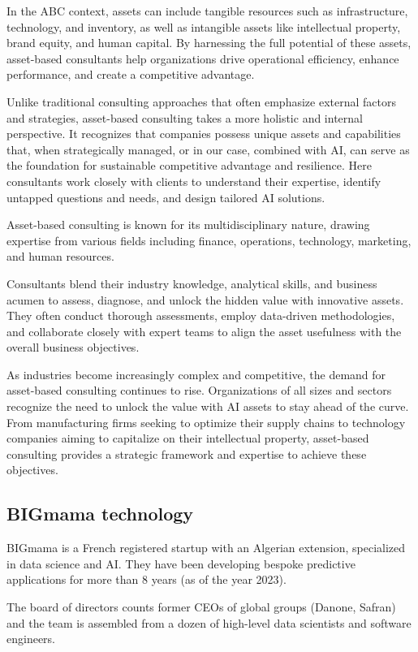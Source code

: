 \documentclass[a4paper,12pt]{article}
\begin{document}
In the ABC context, assets can include tangible resources such as infrastructure, 
technology, and inventory, as well as intangible assets like intellectual property, brand equity, and human capital. 
By harnessing the full potential of these assets, asset-based consultants help organizations drive operational efficiency, 
enhance performance, and create a competitive advantage.

Unlike traditional consulting approaches that often emphasize external factors and strategies, 
asset-based consulting takes a more holistic and internal perspective. 
It recognizes that companies possess unique assets and capabilities that, when strategically managed, or in our case, combined with AI, 
can serve as the foundation for sustainable competitive advantage and resilience. 
Here consultants work closely with clients to understand their expertise, identify untapped questions and needs, and design tailored AI solutions.

Asset-based consulting is known for its multidisciplinary nature, drawing expertise from various fields including finance, 
operations, technology, marketing, and human resources. 

Consultants blend their industry knowledge, analytical skills, and business acumen to assess, 
diagnose, and unlock the hidden value with innovative assets. They often conduct thorough assessments, employ data-driven methodologies, and collaborate closely with expert teams 
to align the asset usefulness with the overall business objectives.

As industries become increasingly complex and competitive, the demand for asset-based consulting continues to rise. 
Organizations of all sizes and sectors recognize the need to unlock the value with AI assets to stay ahead of the curve. 
From manufacturing firms seeking to optimize their supply chains to technology companies aiming to capitalize on their intellectual property, 
asset-based consulting provides a strategic framework and expertise to achieve these objectives.

\subsection{BIGmama technology}
BIGmama is a French registered startup with an Algerian extension, specialized in data science and AI. 
They have been developing bespoke predictive applications for more than 8 years (as of the year 2023).

The board of directors counts former CEOs of global groups (Danone, Safran) and the team is assembled from a dozen of high-level data scientists 
and software engineers.
\end{document}
